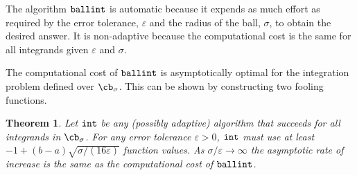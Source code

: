 \documentclass[]{article}
\DeclareMathOperator{\goodinteg}{\texttt{\textup{int}}}
\DeclareMathOperator{\ballinteg}{\texttt{\textup{ballint}}}
\newtheorem{theorem}{Theorem}
\theoremstyle{definition}
\theoremstyle{remark}
\begin{document}
The algorithm $\ballinteg$ is automatic because it expends as much effort as required by the error tolerance, $\varepsilon$ and the radius of the ball, $\sigma$, to obtain the desired answer.  It is non-adaptive because the computational cost is the same for all integrands given $\varepsilon$ and $\sigma$.

The computational cost of $\ballinteg$ is asymptotically optimal for the integration problem defined over $\cb_{\sigma}$.  This can be shown by constructing two fooling functions. 

\begin{theorem} \label{compcostballint}
Let $\goodinteg$ be any (possibly adaptive) algorithm that succeeds for all integrands in $\cb_{\sigma}$. For any error tolerance $\varepsilon>0$, $\goodinteg$ must use
at least $-1 +(b-a)\sqrt{\sigma/(16\varepsilon)}$ function values.  As $\sigma/\varepsilon \to \infty$ the asymptotic rate of increase is the same as the computational cost of $\ballinteg$.
\end{theorem}
\end{document}
